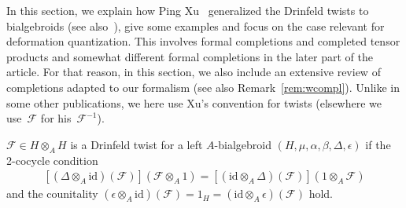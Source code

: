 \documentclass[10pt,a4paper]{amsart}
\numberwithin{equation}{section}
\begin{document}
In this section, we explain how Ping Xu~\cite{xu} generalized the Drinfeld twists to bialgebroids (see also~\cite{doninmudrov}), give some examples and focus on the case relevant for deformation quantization. This involves formal completions and completed tensor products and somewhat different formal completions in the later part of the article. For that reason, in this section, we also include an extensive review of completions adapted to our formalism (see also Remark~\ref{rem:wcompl}). Unlike in some other publications, we here use Xu's convention for twists (elsewhere we use~$\mathcal{F}$ for his~$\mathcal{F}^{-1}$).

\begin{Definition}[\cite{xu}]
$\mathcal{F}\in H\otimes_A H$ is a Drinfeld twist for a left $A$-bialgebroid
$(H,\mu,\alpha,\beta,\Delta,\epsilon)$
if the 2-cocycle condition
\begin{gather}\label{eq:2coc}
[(\Delta\otimes_A \mathrm{id})(\mathcal{F})](\mathcal{F}\otimes_A 1)
=
[(\mathrm{id}\otimes_A\Delta)(\mathcal{F})](1\otimes_A\mathcal{F})
\end{gather}
and the counitality $(\epsilon\otimes_A\mathrm{id})(\mathcal{F}) = 1_H
= (\mathrm{id}\otimes_A\epsilon)(\mathcal{F})$ hold.
\end{Definition}
\end{document}
